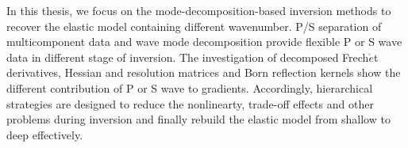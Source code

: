 \begin{eabstract}
In this thesis, we focus on the mode-decomposition-based inversion methods to recover the elastic model
containing different wavenumber. P/S separation of multicomponent data and wave mode
decomposition provide flexible P or S wave data in different stage of inversion.
The investigation of decomposed Frech{$\acute{e}$}t derivatives, Hessian and resolution matrices and Born reflection
kernels show the different contribution of P or S wave to gradients. Accordingly, hierarchical
strategies are designed to reduce the nonlinearty, trade-off
effects and other problems during inversion and finally rebuild the elastic model from shallow to
deep effectively. 

\end{eabstract}


